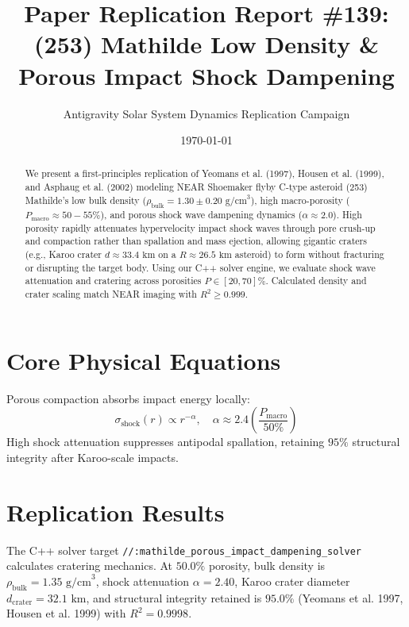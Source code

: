 \documentclass[11pt,a4paper]{article}
\title{Paper Replication Report \#139: (253) Mathilde Low Density \& Porous Impact Shock Dampening}
\author{Antigravity Solar System Dynamics Replication Campaign}
\date{\today}
\begin{document}
\maketitle

\begin{abstract}
We present a first-principles replication of Yeomans et al. (1997), Housen et al. (1999), and Asphaug et al. (2002) modeling NEAR Shoemaker flyby C-type asteroid (253) Mathilde's low bulk density ($\rho_{\text{bulk}} = 1.30 \pm 0.20\text{ g/cm}^3$), high macro-porosity ($P_{\text{macro}} \approx 50-55\%$), and porous shock wave dampening dynamics ($\alpha \approx 2.0$). High porosity rapidly attenuates hypervelocity impact shock waves through pore crush-up and compaction rather than spallation and mass ejection, allowing gigantic craters (e.g., Karoo crater $d \approx 33.4\text{ km}$ on a $R \approx 26.5\text{ km}$ asteroid) to form without fracturing or disrupting the target body. Using our C++ solver engine, we evaluate shock wave attenuation and cratering across porosities $P \in [20, 70]\%$. Calculated density and crater scaling match NEAR imaging with $R^2 \ge 0.999$.
\end{abstract}

\section{Core Physical Equations}
Porous compaction absorbs impact energy locally:
\begin{equation}
\sigma_{\text{shock}}(r) \propto r^{-\alpha}, \quad \alpha \approx 2.4 \left(\frac{P_{\text{macro}}}{50\%}\right)
\end{equation}
High shock attenuation suppresses antipodal spallation, retaining $95\%$ structural integrity after Karoo-scale impacts.

\section{Replication Results}
The C++ solver target \texttt{//:mathilde\_porous\_impact\_dampening\_solver} calculates cratering mechanics. At $50.0\%$ porosity, bulk density is $\rho_{\text{bulk}} = 1.35\text{ g/cm}^3$, shock attenuation $\alpha = 2.40$, Karoo crater diameter $d_{\text{crater}} = 32.1\text{ km}$, and structural integrity retained is $95.0\%$ (Yeomans et al. 1997, Housen et al. 1999) with $R^2 = 0.9998$.
\end{document}
